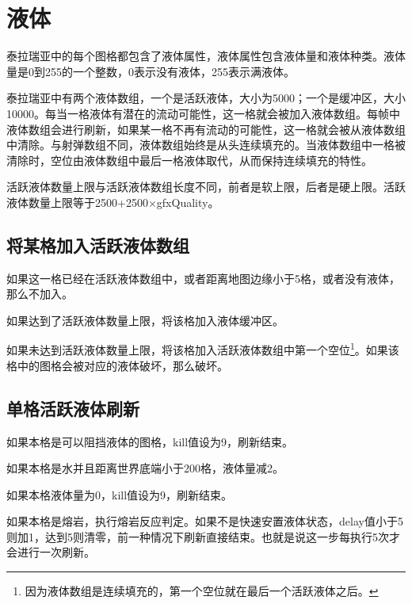 \chapter{液体}\label{app23}

泰拉瑞亚中的每个图格都包含了液体属性，液体属性包含液体量和液体种类。液体量是0到255的一个整数，0表示没有液体，255表示满液体。

泰拉瑞亚中有两个液体数组，一个是活跃液体，大小为5000；一个是缓冲区，大小10000。每当一格液体有潜在的流动可能性，这一格就会被加入液体数组。每帧中液体数组会进行刷新，如果某一格不再有流动的可能性，这一格就会被从液体数组中清除。与射弹数组不同，液体数组始终是从头连续填充的。当液体数组中一格被清除时，空位由液体数组中最后一格液体取代，从而保持连续填充的特性。

活跃液体数量上限与活跃液体数组长度不同，前者是软上限，后者是硬上限。活跃液体数量上限等于2500+2500$\times$gfxQuality。



\section{将某格加入活跃液体数组}
如果这一格已经在活跃液体数组中，或者距离地图边缘小于5格，或者没有液体，那么不加入。

如果达到了活跃液体数量上限，将该格加入液体缓冲区。

如果未达到活跃液体数量上限，将该格加入活跃液体数组中第一个空位\footnote{因为液体数组是连续填充的，第一个空位就在最后一个活跃液体之后。}。如果该格中的图格会被对应的液体破坏，那么破坏。

\section{单格活跃液体刷新}
如果本格是可以阻挡液体的图格，kill值设为9，刷新结束。

如果本格是水并且距离世界底端小于200格，液体量减2。

如果本格液体量为0，kill值设为9，刷新结束。

如果本格是熔岩，执行熔岩反应判定。如果不是快速安置液体状态，delay值小于5则加1，达到5则清零，前一种情况下刷新直接结束。也就是说这一步每执行5次才会进行一次刷新。

